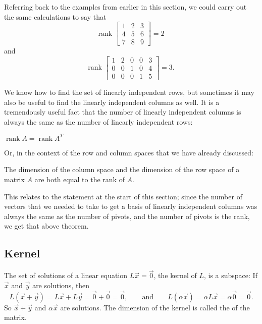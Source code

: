 \documentclass{ximera}
\begin{document}
Referring back to the examples from earlier in this section, we could carry out the same calculations to say that 
\begin{equation*}
    \text{rank } 
    \begin{bmatrix} 
        1 & 2 & 3 \\ 
        4 & 5 & 6 \\ 
        7 & 8 & 9 
    \end{bmatrix} 
    = 2 
\end{equation*}
and
\begin{equation*}
    \text{rank } \begin{bmatrix} 
        1 & 2 & 0 & 0 & 3 \\ 
        0 & 0 & 1 & 0 & 4 \\
        0 & 0 & 0 & 1 & 5 
    \end{bmatrix} 
    = 3.
\end{equation*}

We know how to find the set of linearly independent rows, but sometimes it may also be useful to find the linearly independent columns as well. It is a tremendously useful fact that the number of linearly independent columns is always the same as the number of linearly independent rows:

\begin{theorem}{}
    $\operatorname{rank} A = \operatorname{rank} A^T$
\end{theorem}

Or, in the context of the row and column spaces that we have already discussed:

\begin{theorem}[Rank]
    The dimension of the column space and the dimension of the row space of a matrix $A$ are both equal to the rank of $A$.
\end{theorem}

This relates to the statement at the start of this section; since the number of vectors that we needed to take to get a basis of linearly independent columns was always the same as the number of pivots, and the number of pivots is the rank, we get that above theorem.


\subsection{Kernel}

The set of solutions of a linear equation $L\vec{x} = \vec{0}$,  the kernel of $L$, is a subspace: If $\vec{x}$ and $\vec{y}$ are solutions, then
\begin{equation*}
    L(\vec{x}+\vec{y}) = L\vec{x}+L\vec{y} =  \vec{0}+\vec{0} = \vec{0} , \qquad \text{and} \qquad L(\alpha \vec{x}) = \alpha L \vec{x} = \alpha \vec{0} = \vec{0}.
\end{equation*}
So $\vec{x}+\vec{y}$ and $\alpha \vec{x}$ are solutions.
The dimension of the kernel is called the \emph{} of the matrix.
\end{document}
